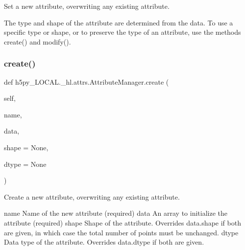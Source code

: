 \begin{DoxyVerb}Set a new attribute, overwriting any existing attribute.

The type and shape of the attribute are determined from the data.  To
use a specific type or shape, or to preserve the type of an attribute,
use the methods create() and modify().
\end{DoxyVerb}
 \mbox{\label{classh5py__LOCAL_1_1__hl_1_1attrs_1_1AttributeManager_a485b851bb62a163f16f0c29113d11312}} 
\subsubsection{\texorpdfstring{create()}{create()}}
{\footnotesize\ttfamily def h5py\+\_\+\+L\+O\+C\+A\+L.\+\_\+hl.\+attrs.\+Attribute\+Manager.\+create (\begin{DoxyParamCaption}\item[{}]{self,  }\item[{}]{name,  }\item[{}]{data,  }\item[{}]{shape = {\ttfamily None},  }\item[{}]{dtype = {\ttfamily None} }\end{DoxyParamCaption})}

\begin{DoxyVerb}Create a new attribute, overwriting any existing attribute.

name
    Name of the new attribute (required)
data
    An array to initialize the attribute (required)
shape
    Shape of the attribute.  Overrides data.shape if both are
    given, in which case the total number of points must be unchanged.
dtype
    Data type of the attribute.  Overrides data.dtype if both
    are given.
\end{DoxyVerb}
 \mbox{\label{classh5py__LOCAL_1_1__hl_1_1attrs_1_1AttributeManager_a3dfa17073e54977bb867c1f3359065a9}} 
